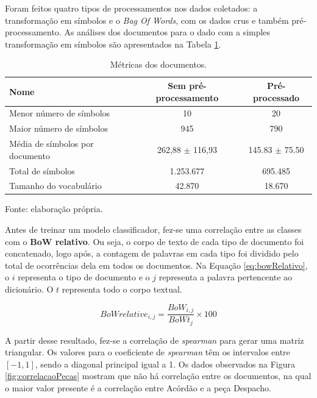 Foram feitos quatro tipos de processamentos nos dados coletados: a transformação em símbolos e o \textit{Bag Of Words}, com os dados crus e também pré-processamento. As análises dos documentos para o dado com a simples transformação em símbolos são apresentados na Tabela \ref{tab:metricasDocumentos}.

\begin{table}[ht]
	\centering    
	\caption[Métricas dos documentos]{Métricas dos documentos.}
    \label{tab:metricasDocumentos}
	\begin{tabular}{|l|c|c|}
        \hline
        \textbf{Nome} & \textbf{Sem pré-processamento} & \textbf{Pré-processado} \\
        \hline
        Menor número de símbolos & 10 & 20 \\
        \hline
        Maior número de símbolos & 945 & 790 \\
        \hline
        Média de símbolos por documento & 262,88 $\pm$ 116,93 & 145.83 $\pm$ 75.50 \\
        \hline
        Total de símbolos & 1.253.677 & 695.485 \\
        \hline
        Tamanho do vocabulário & 42.870 & 18.670 \\
        \hline
    \end{tabular}\par Fonte: elaboração própria.
\end{table}

Antes de treinar um modelo classificador, fez-se uma correlação entre as classes com o \textbf{BoW relativo}. Ou seja, o corpo de texto de cada tipo de documento foi concatenado, logo após, a contagem de palavras em cada tipo foi dividido pelo total de ocorrências dela em todos os documentos. Na Equação \ref{eq:bowRelativo}, o $i$ representa o tipo de documento e o $j$ representa a palavra pertencente ao dicionário. O $t$ representa todo o corpo textual.

\begin{equation}
\label{eq:bowRelativo}
	BoWrelative_{i,j} = \frac{BoW_{i,j}}{BoWt_{j}} \times 100
\end{equation}

A partir desse resultado, fez-se a correlação de \textit{spearman} para gerar uma matriz triangular. Os valores para o coeficiente de \textit{spearman} têm os intervalos entre $[-1,1]$, sendo a diagonal principal igual a 1. Os dados observados na Figura \ref{fig:correlacaoPecas} mostram que não há correlação entre os documentos, na qual o maior valor presente é a correlação entre Acórdão e a peça Despacho.

